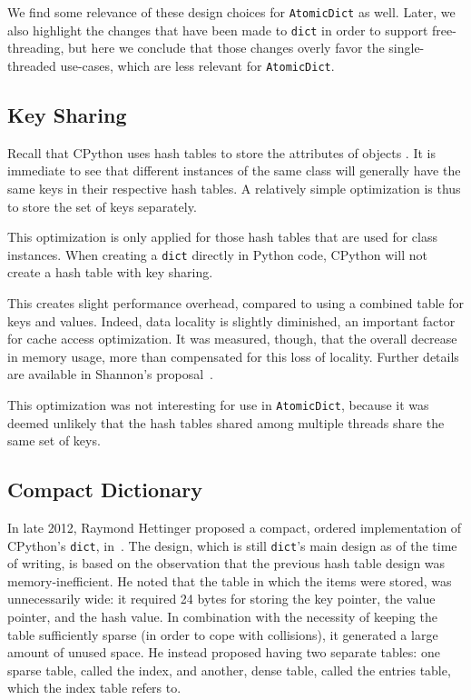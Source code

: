 We find some relevance of these design choices for \texttt{AtomicDict} as well.
Later, we also highlight the changes that have been made to \texttt{dict} in order to support free-threading, but here we conclude that those changes overly favor the single-threaded use-cases, which are less relevant for \texttt{AtomicDict}.


\subsection{Key Sharing}\label{subsec:key-sharing}

Recall that CPython uses hash tables to store the attributes of objects	.
It is immediate to see that different instances of the same class will generally have the same keys in their respective hash tables.
A relatively simple optimization is thus to store the set of keys separately.

This optimization is only applied for those hash tables that are used for class instances.
When creating a \texttt{dict} directly in Python code, CPython will not create a hash table with key sharing.

This creates slight performance overhead, compared to using a combined table for keys and values.
Indeed, data locality is slightly diminished, an important factor for cache access optimization.
It was measured, though, that the overall decrease in memory usage, more than compensated for this loss of locality.
Further details are available in Shannon's proposal~\cite{pep412}.

This optimization was not interesting for use in \texttt{AtomicDict}, because it was deemed unlikely that the hash tables shared among multiple threads share the same set of keys.


\subsection{Compact Dictionary}\label{subsec:compact-dict}

In late 2012, Raymond Hettinger proposed a compact, ordered implementation of CPython's \texttt{dict}, in~\cite{hettinger-dict}.
The design, which is still \texttt{dict}'s main design as of the time of writing, is based on the observation that the previous hash table design was memory-inefficient.
He noted that the table in which the items were stored, was unnecessarily wide: it required 24 bytes for storing the key pointer, the value pointer, and the hash value.
In combination with the necessity of keeping the table sufficiently sparse (in order to cope with collisions), it generated a large amount of unused space.
He instead proposed having two separate tables: one sparse table, called the index, and another, dense table, called the entries table, which the index table refers to.

